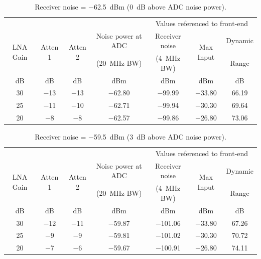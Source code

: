 \documentclass[12pt,letterpaper]{article}
\begin{document}
\begin{table}[htbp]
  \renewcommand{\multirowsetup}{\centering}
  \centering
  \caption{Receiver noise = $-$62.5~dBm (0~dB above ADC noise power).}
  \label{tab:0dB_noise_rise}
  \vspace{0.5em}
  \begin{tabular}{ccccccc}
    & & & & \multicolumn{3}{c}{Values referenced to front-end} \\
    \cline{5-7}
    \multirow{2}{*}{LNA Gain} & \multirow{2}{*}{Atten 1} & \multirow{2}{*}{Atten 2} & Noise power at ADC & Receiver noise & \multirow{2}{*}{Max Input} & Dynamic \\
    & & & (20~MHz BW) & (4~MHz BW) & & Range \\
    dB & dB & dB & dBm & dBm & dBm & dB \\
    \hline
    30 & $-$13 & $-$13 & $-$62.80 & $-$99.99 & $-$33.80 & 66.19 \\
    25 & $-$11 & $-$10 & $-$62.71 & $-$99.94 & $-$30.30 & 69.64 \\
    20 &  $-$8 &  $-$8 & $-$62.57 & $-$99.86 & $-$26.80 & 73.06 \\
    \hline
  \end{tabular}
\end{table}

\begin{table}[htbp]
  \renewcommand{\multirowsetup}{\centering}
  \centering
  \caption{Receiver noise = $-$59.5~dBm (3~dB above ADC noise power).}
  \label{tab:3dB_noise_rise}
  \vspace{0.5em}
  \begin{tabular}{ccccccc}
    & & & & \multicolumn{3}{c}{Values referenced to front-end} \\
    \cline{5-7}
    \multirow{2}{*}{LNA Gain} & \multirow{2}{*}{Atten 1} & \multirow{2}{*}{Atten 2} & Noise power at ADC & Receiver noise & \multirow{2}{*}{Max Input} & Dynamic \\
    & & & (20~MHz BW) & (4~MHz BW) & & Range \\
    dB & dB & dB & dBm & dBm & dBm & dB \\
    \hline
    30 & $-$12 & $-$11 & $-$59.87 & $-$101.06 & $-$33.80 & 67.26 \\
    25 &  $-$9 &  $-$9 & $-$59.81 & $-$101.02 & $-$30.30 & 70.72 \\
    20 &  $-$7 &  $-$6 & $-$59.67 & $-$100.91 & $-$26.80 & 74.11 \\
    \hline
  \end{tabular}
\end{table}
\end{document}
